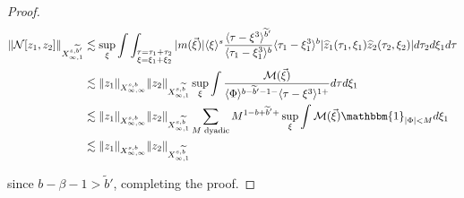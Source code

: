 \documentclass[a4paper,
11pt,  reqno]{amsart}
\newcommand{\jap}[1]{\langle #1 \rangle}
\newcommand{\5}{\textup{V}}
\newcommand{\noi}{\noindent}
\newcommand{\ft}{\widehat}
\newcommand{\wt}{\widetilde}
\theoremstyle{remark}
\newcommand{\be}{\beta}
\newcommand{\jb}[1]
{\langle #1 \rangle}
\numberwithin{equation}{section}
\numberwithin{theorem}{section}
\newcommand{\Ncal}{\mathcal{N}}
\begin{document}
\begin{proof}
			\begin{align}
				\|\Ncal[z_1,z_2]\|_{X^{s,\wt{b}'}_{\infty,1}} 
&
\lesssim \sup_\xi \int \int_{\substack{\tau=\tau_1+\tau_2\\ \xi=\xi_1+\xi_2}} 
|m(\vec\xi)|
\jb{\xi}^s \frac{\jap{\tau-\xi^3}^{\wt{b}'}}{\jap{\tau_1-\xi_1^3}^b} \jap{\tau_1-\xi_1^3}^b
|\ft{z}_1(\tau_1, \xi_1)
\ft{z}_2(\tau_2, \xi_2)
|
 d\tau_2 d\xi_1 d\tau
 \\
&
\lesssim 
\|z_1\|_{X^{s,b}_{\infty,\infty}} \|z_2\|_{X^{s,\wt{b}}_{\infty,1}} 
\sup_\xi \int \frac{\mathcal{M}(\vec\xi)}{\jap{\Phi}^{b-\wt{b}'-1-}\jap{\tau-\xi^3}^{1+} } d\tau d\xi_1 
\\
&
\lesssim 
\|z_1\|_{X^{s,b}_{\infty,\infty}} \|z_2\|_{X^{s,\wt{b}}_{\infty,1}} 
\sum_{M \text{ dyadic}} M^{1-b+\wt{b}'+} \sup_\xi \int \mathcal{M}(\vec\xi) \mathbbm{1}_{|\Phi|<M} d\xi_1
\\
&
 \lesssim\|z_1\|_{X^{s,b}_{\infty,\infty}}  \|z_2\|_{X^{s,\wt{b}}_{\infty,1}}
			\end{align}

            \noi 
			since $b- \be - 1 >\wt b '$, completing the proof. 

		\end{proof}
		
\end{document}
